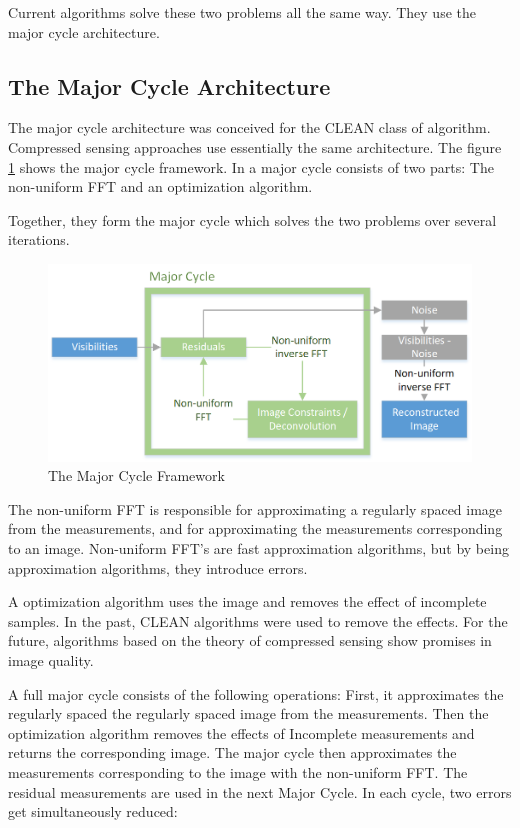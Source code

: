 Current algorithms solve these two problems all the same way. They use the major cycle architecture.


\subsection{The Major Cycle Architecture}
The major cycle architecture was conceived for the CLEAN class of algorithm. Compressed sensing approaches use essentially the same architecture. The figure \ref{intro:major} shows the major cycle framework. In a major cycle consists of two parts: The non-uniform FFT and an optimization algorithm.

Together, they form the major cycle which solves the two problems over several iterations. 

\begin{figure}
	\centering
	\vspace{-10pt}
	\includegraphics[width=1.0\linewidth]{./chapters/01.intro/Major-Minor.png}
	\caption{The Major Cycle Framework}
	\label{intro:major}
	\vspace{-10pt}
\end{figure}

The non-uniform FFT is responsible for approximating a regularly spaced image from the measurements, and for approximating the measurements corresponding to an image. Non-uniform FFT's are fast approximation algorithms, but by being approximation algorithms, they introduce errors. 

A optimization algorithm uses the image and removes the effect of incomplete samples. In the past, CLEAN algorithms were used to remove the effects. For the future, algorithms based on the theory of compressed sensing show promises in image quality.

A full major cycle consists of the following operations: First, it approximates the regularly spaced the regularly spaced image from the measurements. Then the optimization algorithm removes the effects of Incomplete measurements and returns the corresponding image. The major cycle then approximates the measurements corresponding to the image with the non-uniform FFT. The residual measurements are used in the next Major Cycle. In each cycle, two errors get simultaneously reduced:


